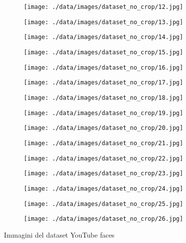 \begin{figure}
\begin{subfigure}{0.1 \textwidth}
		\texttt{[image: ./data/images/dataset\_no\_crop/12.jpg]}
	\end{subfigure}
	\begin{subfigure}{0.1 \textwidth}
		\texttt{[image: ./data/images/dataset\_no\_crop/13.jpg]}
	\end{subfigure}
	\begin{subfigure}{0.1 \textwidth}
		\texttt{[image: ./data/images/dataset\_no\_crop/14.jpg]}
	\end{subfigure}
	\begin{subfigure}{0.1 \textwidth}
		\texttt{[image: ./data/images/dataset\_no\_crop/15.jpg]}
	\end{subfigure}
	\begin{subfigure}{0.1 \textwidth}
		\texttt{[image: ./data/images/dataset\_no\_crop/16.jpg]}
	\end{subfigure}
	\begin{subfigure}{0.1 \textwidth}
		\texttt{[image: ./data/images/dataset\_no\_crop/17.jpg]}
	\end{subfigure}
	\begin{subfigure}{0.1 \textwidth}
		\texttt{[image: ./data/images/dataset\_no\_crop/18.jpg]}
	\end{subfigure}
	\begin{subfigure}{0.1 \textwidth}
		\texttt{[image: ./data/images/dataset\_no\_crop/19.jpg]}
	\end{subfigure}
	\begin{subfigure}{0.1 \textwidth}
		\texttt{[image: ./data/images/dataset\_no\_crop/20.jpg]}
	\end{subfigure}
	\begin{subfigure}{0.1 \textwidth}
		\texttt{[image: ./data/images/dataset\_no\_crop/21.jpg]}
	\end{subfigure}
	\begin{subfigure}{0.1 \textwidth}
		\texttt{[image: ./data/images/dataset\_no\_crop/22.jpg]}
	\end{subfigure}
	\begin{subfigure}{0.1 \textwidth}
		\texttt{[image: ./data/images/dataset\_no\_crop/23.jpg]}
	\end{subfigure}
	\begin{subfigure}{0.1 \textwidth}
		\texttt{[image: ./data/images/dataset\_no\_crop/24.jpg]}
	\end{subfigure}
	\begin{subfigure}{0.1 \textwidth}
		\texttt{[image: ./data/images/dataset\_no\_crop/25.jpg]}
	\end{subfigure}
	\begin{subfigure}{0.1 \textwidth}
		\texttt{[image: ./data/images/dataset\_no\_crop/26.jpg]}
	\end{subfigure}
	\caption{Immagini del dataset YouTube faces \cite{wolf2011face}}
	\label{test_images}
\end{figure}

